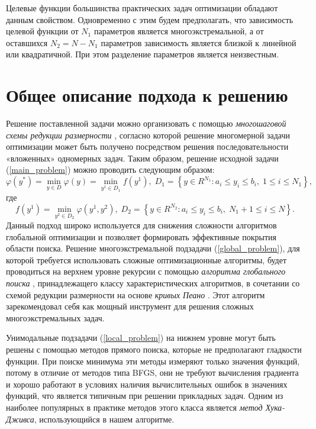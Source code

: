\documentclass[11pt, oneside, a4paper]{article}
\begin{document}
Целевые функции большинства практических задач оптимизации обладают данным свойством.
Одновременно с этим будем предполагать, что зависимость целевой функции от $N_1$ параметров является многоэкстремальной, а от оставшихся $N_2 = N - N_1$ параметров зависимость является близкой к линейной или квадратичной. При этом разделение  параметров является неизвестным.

\section{Общее описание подхода к решению}

Решение поставленной задачи можно организовать с помощью \textit{многошаговой схемы редукции размерности} \cite{Grishagin2007}, согласно которой решение многомерной задачи оптимизации может быть получено посредством решения последовательности «вложенных» одномерных задач. Таким образом, решение исходной задачи (\ref{main_problem}) можно проводить следующим образом:
\begin{equation}\label{global_problem}
\varphi(y^*) = \min_{y\in D} \varphi (y) = \min_{y^1\in D_1} f(y^1), \; D_1=\left\{y\in R^{N_1}: 
a_i\leq y_i \leq b_i, \; 1\leq i \leq N_1\right\},
\end{equation}
где 
\begin{equation}\label{local_problem}
f(y^1) = \min_{ y^2 \in D_2} \varphi(y^1,y^2), \; D_2=\left\{y\in R^{N_2}: a_i\leq y_i \leq b_i, \; 
N_1+1\leq i \leq N\right\}. 
\end{equation}
Данный подход широко используется для снижения сложности алгоритмов глобальной оптимизации и позволяет формировать эффективные покрытия области поиска.
Решение  многоэкстремальной подзадачи (\ref{global_problem}), для которой требуется использовать сложные оптимизационные алгоритмы, будет проводиться на верхнем уровне рекурсии с помощью \textit{алгоритма глобального поиска} \cite{Strongin13}, принадлежащего классу характеристических алгоритмов, в сочетании со схемой редукции размерности на основе \textit{кривых Пеано} \cite{Sergeyev2013}. Этот алгоритм зарекомендовал себя как мощный инструмент для решения сложных многоэкстремальных задач.

Унимодальные подзадачи (\ref{local_problem}) на нижнем уровне могут быть решены с помощью методов прямого поиска, которые не предполагают гладкости функции.
При поиске минимума эти методы измеряют только значения функций, потому в отличие от методов типа BFGS, они не требуют вычисления градиента и хорошо работают в условиях наличия вычислительных ошибок в значениях функций, что является типичным при решении прикладных задач. Одним из наиболее популярных в практике методов этого класса является \textit{метод Хука-Дживса}, использующийся в нашем алгоритме. 
\end{document}
